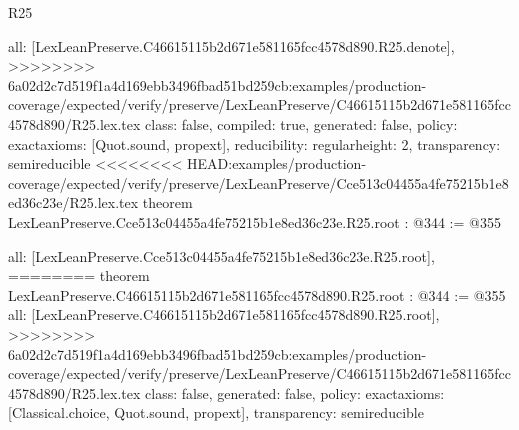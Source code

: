 \begin{lexlean}{R25}
\begin{coremodule}
{{{{{  all: [LexLeanPreserve.C46615115b2d671e581165fcc4578d890.R25.denote],
>>>>>>>> 6a02d2c7d519f1a4d169ebb3496fbad51bd259cb:examples/production-coverage/expected/verify/preserve/LexLeanPreserve/C46615115b2d671e581165fcc4578d890/R25.lex.tex
  class: false,
  compiled: true,
  generated: false,
  policy: exact{axioms: [Quot.sound, propext]},
  reducibility: regular{height: 2},
  transparency: semireducible
}
<<<<<<<< HEAD:examples/production-coverage/expected/verify/preserve/LexLeanPreserve/Cce513c04455a4fe75215b1e8ed36c23e/R25.lex.tex
theorem LexLeanPreserve.Cce513c04455a4fe75215b1e8ed36c23e.R25.root : @344 := @355 {
  all: [LexLeanPreserve.Cce513c04455a4fe75215b1e8ed36c23e.R25.root],
========
theorem LexLeanPreserve.C46615115b2d671e581165fcc4578d890.R25.root : @344 := @355 {
  all: [LexLeanPreserve.C46615115b2d671e581165fcc4578d890.R25.root],
>>>>>>>> 6a02d2c7d519f1a4d169ebb3496fbad51bd259cb:examples/production-coverage/expected/verify/preserve/LexLeanPreserve/C46615115b2d671e581165fcc4578d890/R25.lex.tex
  class: false,
  generated: false,
  policy: exact{axioms: [Classical.choice, Quot.sound, propext]},
  transparency: semireducible
}

}}}}}
\end{coremodule}
\end{lexlean}

